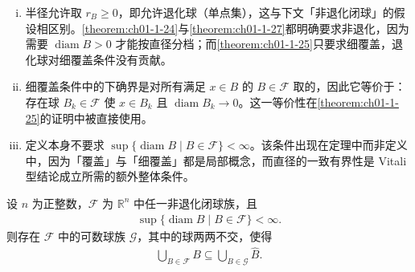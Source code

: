 \documentclass[../../main.tex]{subfiles}%
\begin{document}
\begin{remark}\label{remark:ch01-def-1-19-条件}
\begin{enumerate}[(i)]
\item 半径允许取 $r_B\geqslant0$，即允许退化球（单点集），这与下文「非退化闭球」的假设相区别。\cref{theorem:ch01-1-24}与\cref{theorem:ch01-1-27}都明确要求非退化，因为需要 $\operatorname{diam}B>0$ 才能按直径分档；而\cref{theorem:ch01-1-25}只要求细覆盖，退化球对细覆盖条件没有贡献。%
\item 细覆盖条件中的下确界是对所有满足 $x\in B$ 的 $B\in\mathcal{F}$ 取的，因此它等价于：存在球 $B_k\in\mathcal{F}$ 使 $x\in B_k$ 且 $\operatorname{diam}B_k\to0$。这一等价性在\cref{theorem:ch01-1-25}的证明中被直接使用。%
\item 定义本身不要求 $\sup\{\operatorname{diam}B\mid B\in\mathcal{F}\}<\infty$。该条件出现在定理中而非定义中，因为「覆盖」与「细覆盖」都是局部概念，而直径的一致有界性是 Vitali 型结论成立所需的额外整体条件。
\end{enumerate}
\end{remark}

\begin{theorem}\label{theorem:ch01-1-24}
设 $n$ 为正整数，$\mathcal{F}$ 为 $\mathbb{R}^n$ 中任一非退化闭球族，且
\begin{align*}
\sup\{\operatorname{diam}B\mid B\in\mathcal{F}\}<\infty .
\end{align*}
则存在 $\mathcal{F}$ 中的可数球族 $\mathcal{G}$，其中的球两两不交，使得
\begin{align*}
\bigcup_{B\in\mathcal{F}}B\subseteq\bigcup_{B\in\mathcal{G}}\hat B .
\end{align*}
\end{theorem}
\end{document}
